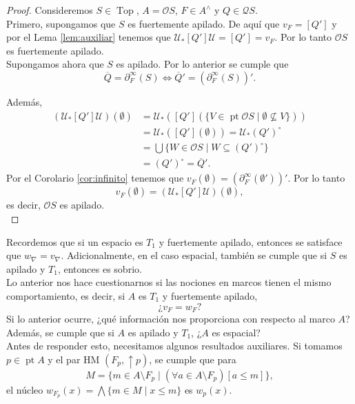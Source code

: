 \documentclass[11pt]{amsart}
\DeclareMathOperator{\pt}{pt}
\DeclareMathOperator{\Top}{Top}
\theoremstyle{plain}
\theoremstyle{definition}
\begin{document}
\begin{proof}
Consideremos $S\in \Top$, $A=\mathcal{O}S$, $F\in A^\wedge$ y $Q\in \mathcal{Q}S$.\\

Primero, supongamos que $S$ es fuertemente apilado. De aquí que $v_F=[Q']$ y por el Lema \ref{lem:auxiliar} tenemos que $\mathcal{U}_*[Q']\mathcal{U}=[Q']=v_F$. Por lo tanto $\mathcal{O}S$ es fuertemente apilado.\\

Supongamos ahora que $S$ es apilado. Por lo anterior se cumple que 
\[
\overline{Q}=\partial_F^\infty(S)\iff \overline{Q}'=(\partial_F^{\infty}(S))'.
\]

Además, 
\[
\begin{split}
(\mathcal{U}_*[Q']\mathcal{U})(\emptyset)&=\mathcal{U}_*([Q'](\{V\in \pt\mathcal{O}S\mid \emptyset \not\subseteq V\}))\\
&=\mathcal{U}_*([Q'](\emptyset))=\mathcal{U}_*(Q')^{\circ}\\
&=\bigcup\{W\in \mathcal{O}S\mid W\subseteq (Q')^\circ\}\\
&=(Q')^{\circ}=\overline{Q}'.
\end{split}
\]
Por el Corolario \ref{cor:infinito} tenemos que $v_F(\emptyset)=(\partial_F^\infty(\emptyset'))'$. Por lo tanto 
\[
v_F(\emptyset)=(\mathcal{U}_*[Q']\mathcal{U})(\emptyset),
\]
es decir, $\mathcal{O}S$ es apilado.\\
\end{proof}

Recordemos que si un espacio es $T_1$ y fuertemente apilado, entonces se satisface que $w_\nabla=v_\nabla$. Adicionalmente, en el caso espacial, también se cumple que
si $S$ es apilado y $T_1$, entonces es sobrio.\\

Lo anterior nos hace cuestionarnos si las nociones en marcos tienen el mismo comportamiento, es decir, si $A$ es $T_1$ y fuertemente apilado, 
\[
\text{¿}v_F=w_F?
\]
Si lo anterior ocurre, ¿qué información nos proporciona con respecto al marco $A$? Además, se cumple que si $A$ es 
apilado y $T_1$, ¿$A$ es espacial?\\ 

Antes de responder esto, necesitamos algunos resultados auxiliares. Si tomamos $p\in \pt A$ y el par HM $(F_p, \uparrow p)$, se cumple que para 
\[
M=\{m\in A\setminus F_p\mid(\forall a\in A\setminus F_p) [a\leq m]\},
\]
el núcleo $w_{F_p}(x)=\bigwedge\{m\in M\mid x\leq m\}$ es $w_p(x)$.\\
\end{document}
